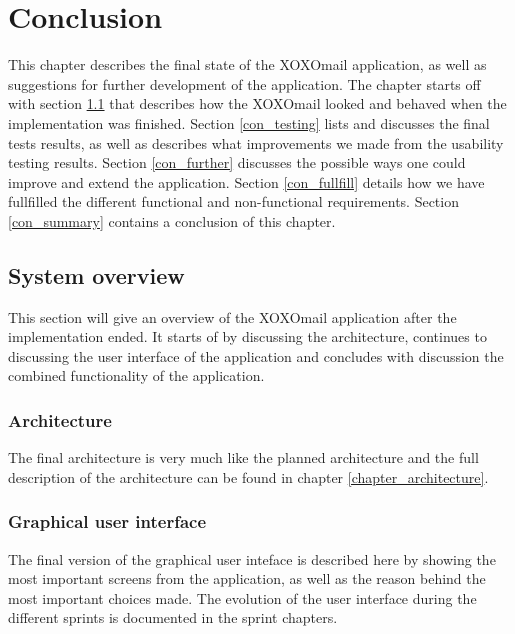 \chapter{Conclusion}

This chapter describes the final state of the XOXOmail application, as well as suggestions for further development of the application. The chapter starts off with section \ref{con_sys_over} that describes how the XOXOmail looked and behaved when the implementation was finished. Section \ref{con_testing} lists and discusses the final tests results, as well as describes what improvements we made from the usability testing results. Section \ref{con_further} discusses the possible ways one could improve and extend the application. Section \ref{con_fullfill} details how we have fullfilled the different functional and non-functional requirements. Section \ref{con_summary} contains a conclusion of this chapter.

\section{System overview}\label{con_sys_over}
This section will give an overview of the XOXOmail application after the implementation ended. It starts of by discussing the architecture, continues to discussing the user interface of the application and concludes with discussion the combined functionality of the application.

\subsection{Architecture}
The final architecture is very much like the planned architecture and the full description of the architecture can be found in chapter \ref{chapter_architecture}.

\subsection{Graphical user interface}
The final version of the graphical user inteface is described here by showing the most important screens from the application, as well as the reason behind the most important choices made. The evolution of the user interface during the different sprints is documented in the sprint chapters.


